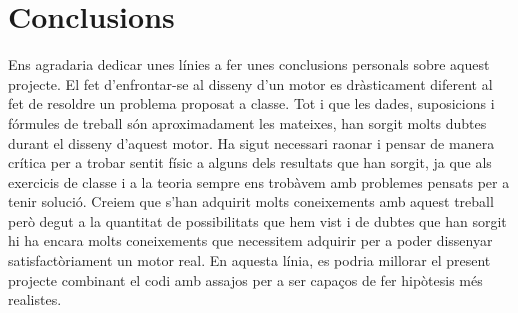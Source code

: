 \section{Conclusions}
Ens agradaria dedicar unes línies a fer unes conclusions personals sobre aquest projecte. El fet d'enfrontar-se al disseny d'un motor es dràsticament diferent al fet de resoldre un problema proposat a classe. Tot i que les dades, suposicions i fórmules de treball són aproximadament les mateixes, han sorgit molts dubtes durant el disseny d'aquest motor. Ha sigut necessari raonar i pensar de manera crítica per a trobar sentit físic a alguns dels resultats que han sorgit, ja que als exercicis de classe i a la teoria sempre ens trobàvem amb problemes pensats per a tenir solució. Creiem que s'han adquirit molts coneixements amb aquest treball però degut a la quantitat de possibilitats que hem vist i de dubtes que han sorgit hi ha encara molts coneixements que necessitem adquirir per a poder dissenyar satisfactòriament un motor real. En aquesta línia, es podria millorar el present projecte combinant el codi amb assajos per a ser capaços de fer hipòtesis més realistes. 